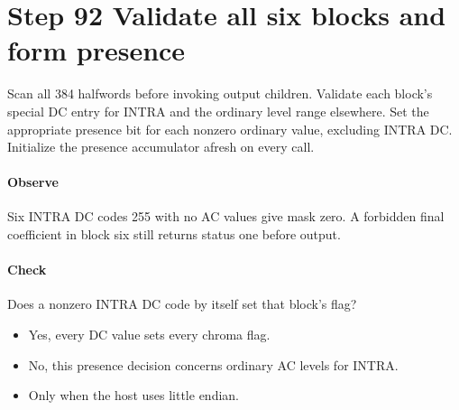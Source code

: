 \section{Step 92 Validate all six blocks and form presence}\label{h263-syntax-s02}
Scan all 384 halfwords before invoking output children. Validate each block's
special DC entry for INTRA and the ordinary level range elsewhere. Set the
appropriate presence bit for each nonzero ordinary value, excluding INTRA DC.
Initialize the presence accumulator afresh on every call.

\paragraph{Observe} Six INTRA DC codes 255 with no AC values give mask zero.
A forbidden final coefficient in block six still returns status one before output.
\paragraph{Check} Does a nonzero INTRA DC code by itself set that block's flag?
\begin{itemize}
  \item[A.] Yes, every DC value sets every chroma flag.
  \item[B.] No, this presence decision concerns ordinary AC levels for INTRA.
  \item[C.] Only when the host uses little endian.
\end{itemize}
